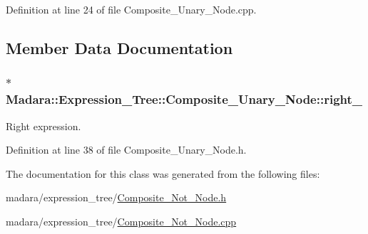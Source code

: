 Definition at line 24 of file Composite\_\-Unary\_\-Node.cpp.



\subsection{Member Data Documentation}
\hypertarget{classMadara_1_1Expression__Tree_1_1Composite__Unary__Node_a077b7bd1b52df6f5c6adfde735556a68}{
\subsubsection[{right\_\-}]{$\ast$ {\bf Madara::Expression\_\-Tree::Composite\_\-Unary\_\-Node::right\_\-}}}
\label{d3/dc7/classMadara_1_1Expression__Tree_1_1Composite__Unary__Node_a077b7bd1b52df6f5c6adfde735556a68}


Right expression. 



Definition at line 38 of file Composite\_\-Unary\_\-Node.h.



The documentation for this class was generated from the following files:\begin{DoxyCompactItemize}
\item 
madara/expression\_\-tree/\hyperlink{Composite__Not__Node_8h}{Composite\_\-Not\_\-Node.h}\item 
madara/expression\_\-tree/\hyperlink{Composite__Not__Node_8cpp}{Composite\_\-Not\_\-Node.cpp}\end{DoxyCompactItemize}
